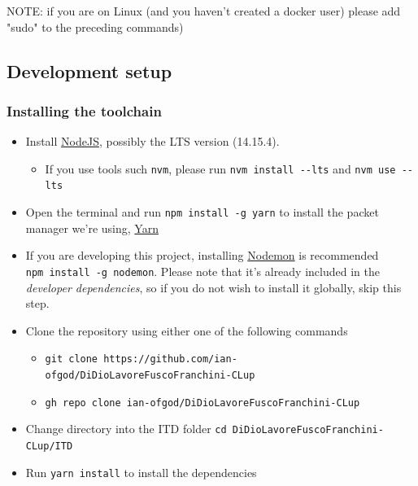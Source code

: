\documentclass[
]{article}
\providecommand{\tightlist}{%
  \setlength{\itemsep}{0pt}\setlength{\parskip}{0pt}}
\begin{document}
NOTE: if you are on Linux (and you haven't created a docker user) please add "sudo" to the preceding commands)



\subsection{Development setup}\label{dev-install}

\hypertarget{installing-the-toolchain}{%
\subsubsection{Installing the toolchain}\label{installing-the-toolchain}}

\begin{itemize}
\tightlist
\item
  Install \href{https://nodejs.org/}{NodeJS}, possibly the LTS version
  (14.15.4).

  \begin{itemize}
  \tightlist
  \item
    If you use tools such \texttt{nvm}, please run
    \texttt{nvm\ install\ -\/-lts} and \texttt{nvm\ use\ -\/-lts}
  \end{itemize}
\item
  Open the terminal and run \texttt{npm\ install\ -g\ yarn} to install
  the packet manager we're using, \href{https://yarnpkg.com}{Yarn}
\item
  If you are developing this project, installing
  \href{https://github.com/remy/nodemon}{Nodemon} is recommended
  \texttt{npm\ install\ -g\ nodemon}. Please note that it's already
  included in the \emph{developer dependencies}, so if you do not wish
  to install it globally, skip this step.
\item
  Clone the repository using either one of the following commands

  \begin{itemize}
  \tightlist
  \item
    \texttt{git\ clone\ https://github.com/ian-ofgod/DiDioLavoreFuscoFranchini-CLup}
  \item
    \texttt{gh\ repo\ clone\ ian-ofgod/DiDioLavoreFuscoFranchini-CLup}
  \end{itemize}
\item
  Change directory into the ITD folder
  \texttt{cd\ DiDioLavoreFuscoFranchini-CLup/ITD}
\item
  Run \texttt{yarn\ install} to install the dependencies
\end{itemize}
\end{document}
